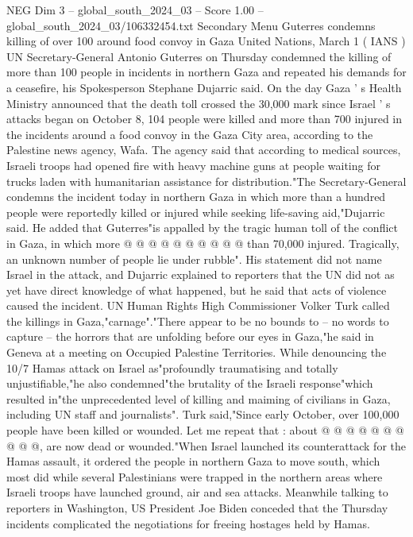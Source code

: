 \begin{textsample}{NEG Dim 3 – global\_south\_2024\_03 – Score 1.00 – global\_south\_2024\_03/106332454.txt}  \label{ex:f3_neg_035}
Secondary Menu Guterres condemns killing of over 100 around food convoy in Gaza United Nations, March 1 ( IANS ) UN Secretary-General Antonio Guterres on Thursday condemned the killing of more than 100 people in incidents in northern Gaza and repeated his demands for a ceasefire, his Spokesperson Stephane Dujarric said.
On the day Gaza ' s Health Ministry announced that the death toll crossed the 30,000 mark since Israel ' s attacks began on October 8, 104 people were killed and more than 700 injured in the incidents around a food convoy in the Gaza City area, according to the Palestine news agency, Wafa.
The agency said that according to medical sources, Israeli troops had opened fire with heavy machine guns at people waiting for trucks laden with humanitarian assistance for distribution."The Secretary-General condemns the incident today in northern Gaza in which more than a hundred people were reportedly killed or injured while seeking life-saving aid,"Dujarric said.
He added that Guterres"is appalled by the tragic human toll of the conflict in Gaza, in which more @ @ @ @ @ @ @ @ @ @ than 70,000 injured.
Tragically, an unknown number of people lie under rubble".
His statement did not name Israel in the attack, and Dujarric explained to reporters that the UN did not as yet have direct knowledge of what happened, but he said that acts of violence caused the incident.
UN Human Rights High Commissioner Volker Turk called the killings in Gaza,"carnage"."There appear to be no bounds to -- no words to capture -- the horrors that are unfolding before our eyes in Gaza,"he said in Geneva at a meeting on Occupied Palestine Territories.
While denouncing the 10/7 Hamas attack on Israel as"profoundly traumatising and totally unjustifiable,"he also condemned"the brutality of the Israeli response"which resulted in"the unprecedented level of killing and maiming of civilians in Gaza, including UN staff and journalists".
Turk said,"Since early October, over 100,000 people have been killed or wounded.
Let me repeat that : about @ @ @ @ @ @ @ @ @ @, are now dead or wounded."When Israel launched its counterattack for the Hamas assault, it ordered the people in northern Gaza to move south, which most did while several Palestinians were trapped in the northern areas where Israeli troops have launched ground, air and sea attacks.
Meanwhile talking to reporters in Washington, US President Joe Biden conceded that the Thursday incidents complicated the negotiations for freeing hostages held by Hamas.

\end{textsample}
